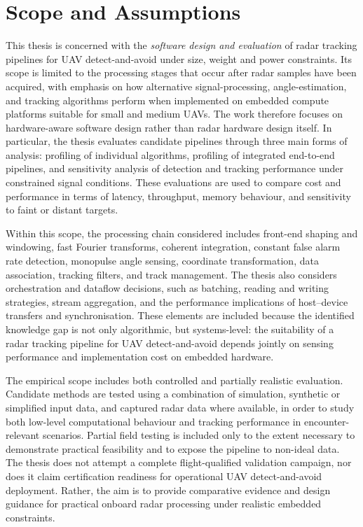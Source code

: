 \section{Scope and Assumptions}
This thesis is concerned with the \emph{software design and evaluation} of radar tracking pipelines for UAV detect-and-avoid under size, weight and power constraints. Its scope is limited to the processing stages that occur after radar samples have been acquired, with emphasis on how alternative signal-processing, angle-estimation, and tracking algorithms perform when implemented on embedded compute platforms suitable for small and medium UAVs. The work therefore focuses on hardware-aware software design rather than radar hardware design itself. In particular, the thesis evaluates candidate pipelines through three main forms of analysis: profiling of individual algorithms, profiling of integrated end-to-end pipelines, and sensitivity analysis of detection and tracking performance under constrained signal conditions. These evaluations are used to compare cost and performance in terms of latency, throughput, memory behaviour, and sensitivity to faint or distant targets. 

Within this scope, the processing chain considered includes front-end shaping and windowing, fast Fourier transforms, coherent integration, constant false alarm rate detection, monopulse angle sensing, coordinate transformation, data association, tracking filters, and track management. The thesis also considers orchestration and dataflow decisions, such as batching, reading and writing strategies, stream aggregation, and the performance implications of host--device transfers and synchronisation. These elements are included because the identified knowledge gap is not only algorithmic, but systems-level: the suitability of a radar tracking pipeline for UAV detect-and-avoid depends jointly on sensing performance and implementation cost on embedded hardware. 

The empirical scope includes both controlled and partially realistic evaluation. Candidate methods are tested using a combination of simulation, synthetic or simplified input data, and captured radar data where available, in order to study both low-level computational behaviour and tracking performance in encounter-relevant scenarios. Partial field testing is included only to the extent necessary to demonstrate practical feasibility and to expose the pipeline to non-ideal data. The thesis does not attempt a complete flight-qualified validation campaign, nor does it claim certification readiness for operational UAV detect-and-avoid deployment. Rather, the aim is to provide comparative evidence and design guidance for practical onboard radar processing under realistic embedded constraints. 

